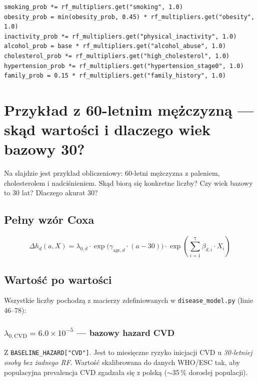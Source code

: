 \documentclass[11pt,a4paper]{article}
\begin{document}
\begin{lstlisting}
smoking_prob *= rf_multipliers.get("smoking", 1.0)
obesity_prob = min(obesity_prob, 0.45) * rf_multipliers.get("obesity", 1.0)
inactivity_prob *= rf_multipliers.get("physical_inactivity", 1.0)
alcohol_prob = base * rf_multipliers.get("alcohol_abuse", 1.0)
cholesterol_prob *= rf_multipliers.get("high_cholesterol", 1.0)
hypertension_prob *= rf_multipliers.get("hypertension_stage0", 1.0)
family_prob = 0.15 * rf_multipliers.get("family_history", 1.0)
\end{lstlisting}

\newpage
\section{Przykład z 60-letnim mężczyzną --- skąd wartości i dlaczego wiek bazowy 30?}

\begin{qbox}
Na slajdzie jest przykład obliczeniowy: 60-letni mężczyzna z paleniem, cholesterolem i nadciśnieniem. Skąd biorą się konkretne liczby? Czy wiek bazowy to 30 lat? Dlaczego akurat 30?
\end{qbox}

\subsection{Pełny wzór Coxa}

\begin{formulabox}
\[
\Delta h_d(a, X) = \lambda_{0,d} \cdot \exp\bigl(\gamma_{\text{age},d} \cdot (a - 30)\bigr) \cdot \exp\!\left(\sum_{i=1}^{7} \beta_{d,i} \cdot X_i\right)
\]
\end{formulabox}

\subsection{Wartość po wartości}

Wszystkie liczby pochodzą z macierzy zdefiniowanych w \texttt{disease\_model.py} (linie 46--78):

\subsubsection{$\lambda_{0,\text{CVD}} = 6.0 \times 10^{-5}$ --- bazowy hazard CVD}

Z \texttt{BASELINE\_HAZARD["CVD"]}. Jest to miesięczne ryzyko inicjacji CVD u \emph{30-letniej osoby bez żadnego RF}. Wartość skalibrowana do danych WHO/ESC tak, aby populacyjna prevalencja CVD zgadzała się z polską ($\sim$35\,\% dorosłej populacji).
\end{document}
